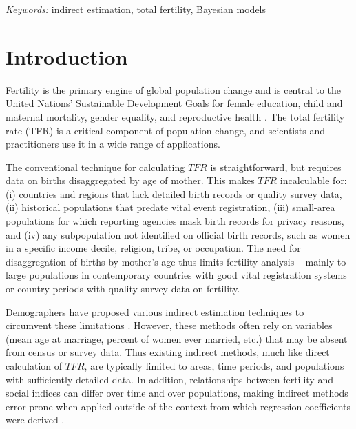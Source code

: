 \documentclass[12pt]{article}
\begin{document}
\noindent%
{\it Keywords:} indirect estimation, total fertility, Bayesian models
\vfill

\newpage
{} %

\hypertarget{introduction}{%
\section{Introduction}\label{introduction}}

Fertility is the primary engine of global population change
\citep{gerland2014} and is central to the United Nations' Sustainable
Development Goals for female education, child and maternal mortality,
gender equality, and reproductive health \citep{abel16}. The total
fertility rate (TFR) is a critical component of population change, and
scientists and practitioners use it in a wide range of applications.

The conventional technique for calculating \(TFR\) is straightforward,
but requires data on births disaggregated by age of mother. This makes
\(TFR\) incalculable for: (i) countries and regions that lack detailed
birth records or quality survey data, (ii) historical populations that
predate vital event registration, (iii) small-area populations for which
reporting agencies mask birth records for privacy reasons, and (iv) any
subpopulation not identified on official birth records, such as women in
a specific income decile, religion, tribe, or occupation. The need for
disaggregation of births by mother's age thus limits fertility analysis
-- mainly to large populations in contemporary countries with good vital
registration systems or country-periods with quality survey data on
fertility.

Demographers have proposed various indirect estimation techniques to
circumvent these limitations \citep{bogue64, rele67}. However, these
methods often rely on variables (mean age at marriage, percent of women
ever married, etc.) that may be absent from census or survey data. Thus
existing indirect methods, much like direct calculation of \(TFR\), are
typically limited to areas, time periods, and populations with
sufficiently detailed data. In addition, relationships between fertility
and social indices can differ over time and over populations, making
indirect methods error-prone when applied outside of the context from
which regression coefficients were derived \citep{tuchfeld74, hauer13}.
\end{document}
